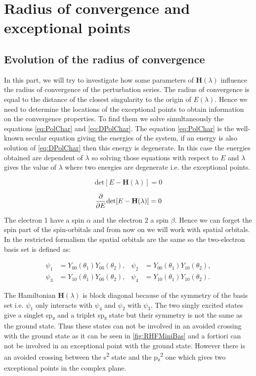 \documentclass[11pt,a4paper]{article}
\newcommand{\bH}{\mathbf{H}}
\begin{document}
\section{Radius of convergence and exceptional points}

\subsection{Evolution of the radius of convergence}

In this part, we will try to investigate how some parameters of $\bH(\lambda)$ influence the radius of convergence of the perturbation series. The radius of convergence is equal to the distance of the closest singularity to the origin of $E(\lambda)$. Hence we need to determine the locations of the exceptional points to obtain information on the convergence properties. To find them we solve simultaneously the equations \eqref{eq:PolChar} and \eqref{eq:DPolChar}. The equation \eqref{eq:PolChar} is the well-known secular equation giving the energies of the system, if an energy is also solution of \eqref{eq:DPolChar} then this energy is degenerate. In this case the energies obtained are dependent of $\lambda$ so solving those equations with respect to $E$ and $\lambda$ gives the value of $\lambda$ where two energies are degenerate i.e. the exceptional points.

\begin{equation}\label{eq:PolChar}
\text{det}[E-\bH(\lambda)]=0
\end{equation}

\begin{equation}\label{eq:DPolChar}
\pdv{E}\text{det}[E-\bH(\lambda)]=0
\end{equation}

The electron 1 have a spin $\alpha$ and the electron 2 a spin $\beta$. Hence we can forget the spin part of the spin-orbitals and from now on we will work with spatial orbitals. In the restricted formalism the spatial orbitals are the same so the two-electron basis set is defined as:

\begin{align}\label{eq:rhfbasis}
 \psi_1 & =Y_{00}(\theta_1)Y_{00}(\theta_2),
 & 
 \psi_2 & =Y_{00}(\theta_1)Y_{10}(\theta_2),\\
 \psi_3 & =Y_{10}(\theta_1)Y_{00}(\theta_2),
 & 
 \psi_4 & =Y_{10}(\theta_1)Y_{10}(\theta_2).
\end{align}

The Hamiltonian $\bH(\lambda)$ is block diagonal because of the symmetry of the basis set i.e. $\psi_1$ only interacts with $\psi_4$ and $\psi_2$ with $\psi_3$. The two singly excited states give a singlet sp\textsubscript{z} and a triplet sp\textsubscript{z} state but their symmetry is not the same as the ground state. Thus these states can not be involved in an avoided crossing with the ground state as it can be seen in \autoref{fig:RHFMiniBas} and a fortiori can not be involved in an exceptional point with the ground state. However there is an avoided crossing between the s\textsuperscript{2} state and the p\textsubscript{z}\textsuperscript{2} one which gives two exceptional points in the complex plane. 
\end{document}
